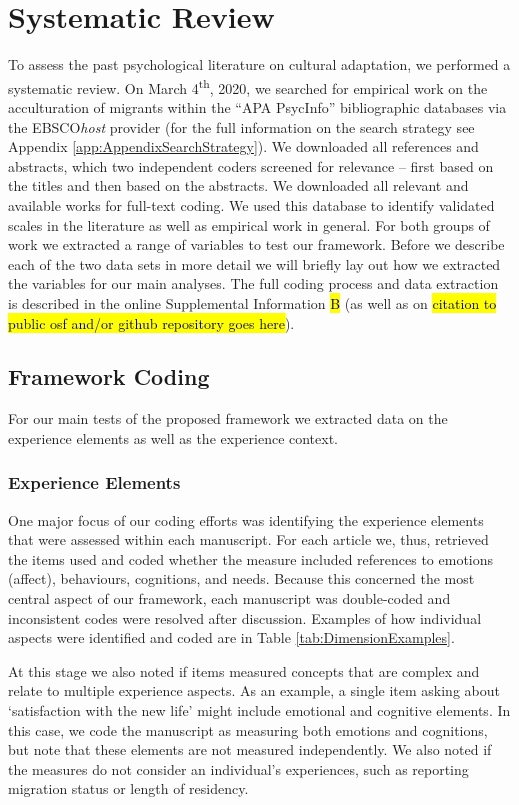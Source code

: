 \documentclass[man, 12pt, a4paper]{apa7}
\begin{document}
\section{Systematic Review}

To assess the past psychological literature on cultural adaptation, we performed a systematic review. On March 4\textsuperscript{th}, 2020, we searched for empirical work on the acculturation of migrants within the ``APA PsycInfo'' bibliographic databases via the EBSCO\textit{host} provider (for the full information on the search strategy see Appendix \ref{app:AppendixSearchStrategy}). We downloaded all references and abstracts, which two independent coders screened for relevance -- first based on the titles and then based on the abstracts. We downloaded all relevant and available works for full-text coding. We used this database to identify validated scales in the literature as well as empirical work in general. For both groups of work we extracted a range of variables to test our framework. Before we describe each of the two data sets in more detail we will briefly lay out how we extracted the variables for our main analyses. The full coding process and data extraction is described in the online Supplemental Information \hl{B} (as well as on \hl{citation to public osf and/or github repository goes here}).

\subsection{Framework Coding}
For our main tests of the proposed framework we extracted data on the experience elements as well as the experience context.
\subsubsection{Experience Elements}
One major focus of our coding efforts was identifying the experience elements that were assessed within each manuscript. For each article we, thus, retrieved the items used and coded whether the measure included references to emotions (affect), behaviours, cognitions, and needs. Because this concerned the most central aspect of our framework, each manuscript was double-coded and inconsistent codes were resolved after discussion. Examples of how individual aspects were identified and coded are in Table \ref{tab:DimensionExamples}.


At this stage we also noted if items measured concepts that are complex and relate to multiple experience aspects. As an example, a single item asking about `satisfaction with the new life' might include emotional and cognitive elements. In this case, we code the manuscript as measuring both emotions and cognitions, but note that these elements are not measured independently. We also noted if the measures do not consider an individual's experiences, such as reporting migration status or length of residency.
\end{document}
